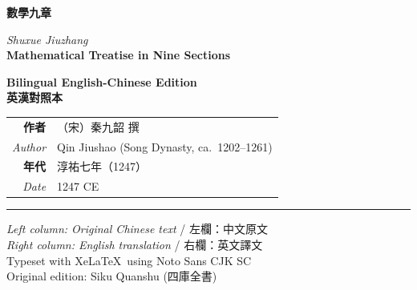 \documentclass[11pt,a4paper]{article}
\providecommand{\XeLaTeX}{XeLaTeX}
\newcommand{\shortline}{\noindent\rule{0.5\textwidth}{0.4pt}\par}
\begin{document}
\begin{titlepage}
\centering
\vspace*{1.5cm}

{\fontsize{26}{34}\selectfont\color{titlecolor}
\textbf{數學九章}
}

\vspace{0.8cm}

{\fontsize{15}{19}\selectfont\color{sectioncolor}
\textit{Shuxue Jiuzhang}\\[0.3em]
\textbf{Mathematical Treatise in Nine Sections}
}

\vspace{1.5cm}

{\Large\color{sectioncolor}
\textbf{Bilingual English-Chinese Edition}\\[0.5em]
\textbf{英漢對照本}
}

\vspace{1.5cm}


\vspace{2.5cm}

{\large
\begin{tabular}{rl}
\textbf{作者} & （宋）秦九韶 撰 \\
\textit{Author} & Qin Jiushao (Song Dynasty, ca.~1202--1261) \\
\textbf{年代} & 淳祐七年（1247） \\
\textit{Date} & 1247 CE \\
\end{tabular}
}

\vspace{2cm}

\shortline

\vspace{0.8cm}

{\small\color{sectioncolor}
\textit{Left column: Original Chinese text} / 左欄：中文原文\\[0.2em]
\textit{Right column: English translation} / 右欄：英文譯文\\[0.8em]
Typeset with \XeLaTeX\ using Noto Sans CJK SC\\
Original edition: Siku Quanshu (四庫全書)
}

\end{titlepage}
\end{document}
